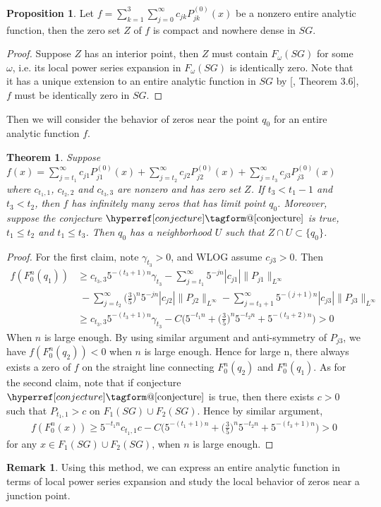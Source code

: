 \documentclass[12pt]{amsart}
\makeatletter
\renewcommand*{\eqref}[1]{%
  \hyperref[{#1}]{\textup{\tagform@{\ref*{#1}}}}%
}
\theoremstyle{plain}
\newtheorem{theorem}{Theorem}[section]
\theoremstyle{definition}
\newtheorem{proposition}{Proposition}[section]
\newtheorem{remark}{Remark}[section]
\makeatother
\begin{document}
\begin{proposition}\label{pr:analytic_zero}
Let $f=\sum\limits^3_{k=1}\sum\limits^\infty_{j=0}c_{jk}P_{jk}^{(0)}(x)$ be a nonzero entire analytic function, then the zero set $Z$ of $f$ is compact and nowhere dense in $SG$.
\end{proposition}
\begin{proof}
Suppose $Z$ has an interior point, then $Z$ must contain $F_\omega(SG)$ for some $\omega$, i.e. its local power series expansion in $F_\omega(SG)$ is identically zero. Note that it has a unique extension to an entire analytic function in $SG$ by [\cite{NSTY}, Theorem 3.6], $f$ must be identically zero in $SG$.
\end{proof}

Then we will consider the behavior of zeros near the point $q_0$ for an entire analytic function $f$.
\begin{theorem}\label{th:zeros}
Suppose $f(x)=\sum\limits^\infty_{j=t_1}c_{j1}P_{j1}^{(0)}(x)+\sum\limits^\infty_{j=t_2}c_{j2}P_{j2}^{(0)}(x)+\sum\limits^\infty_{j=t_3}c_{j3}P_{j3}^{(0)}(x)$ where $c_{t_1,1}$, $c_{t_2,2}$ and $c_{t_3,3}$ are nonzero and has zero set $Z$. If $ t_3<t_1-1$ and $t_3<t_2$, then $f$ has infinitely many zeros that has limit point $q_0$. Moreover, suppose the conjecture $\eqref{conjecture}$ is true, $t_1\le t_2$ and $t_1\le t_3$. Then $q_0$ has a neighborhood $U$ such that $Z\cap U\subset\{q_0\}$.
\end{theorem}
\begin{proof}
For the first claim, note $\gamma_{t_3}>0$, and WLOG assume $c_{j3}>0$. Then 
\begin{align}
f(F_0^n(q_1))&\ge c_{t_3,3}5^{-(t_3+1)n}\gamma_{t_3}-\sum\limits^\infty_{j=t_1}5^{-jn}|c_{j1}|\|P_{j1}\|_{L^\infty}\\
             &\;-\sum\limits^\infty_{j=t_2}\Big(\frac 35\Big)^n5^{-jn}|c_{j2}|\|P_{j2}\|_{L^\infty}-\sum\limits^\infty_{j=t_3+1}5^{-(j+1)n}|c_{j3}|\|P_{j3}\|_{L^\infty} \\
             &\ge c_{t_3,3}5^{-(t_3+1)n}\gamma_{t_3}-C\Big(5^{-t_1n}+\Big(\frac 35\Big)^n5^{-t_2n}+5^{-(t_3+2)n}\Big)>0
\end{align}
When $n$ is large enough. By using similar argument and anti-symmetry of $P_{j3}$, we have $f(F_0^n(q_2))<0$ when $n$ is large enough. Hence for large n, there always exists a zero of $f$ on the straight line connecting $F_0^n(q_2)$ and $F_0^n(q_1)$. As for the second claim, note that if conjecture $\eqref{conjecture}$ is true, then there exists $c>0$ such that $P_{t_1,1}>c$ on $F_1(SG)\cup F_2(SG)$. Hence by similar argument,
\begin{align}
f(F_0^n(x))\ge 5^{-t_1n}c_{t_1,1}c-C\Big(5^{-(t_1+1)n}+\Big(\frac 35\Big)^n5^{-t_2n}+5^{-(t_3+1)n}\Big)>0
\end{align}
for any $x\in F_1(SG)\cup F_2(SG)$, when $n$ is large enough.
\end{proof}
\begin{remark}
Using this method, we can express an entire analytic function in terms of local power series expansion and study the local behavior of zeros near a junction point.
\end{remark}
\end{document}
